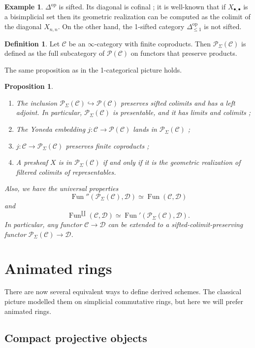 \documentclass[11pt]{article}
\newtheorem{proposition}{Proposition}
\theoremstyle{definition}
\newtheorem{definition}{Definition}
\newtheorem{example}{Example}
\newcommand{\C}{\mathcal{C}}
\newcommand{\D}{\mathcal{D}}
\newcommand{\Fun}{\operatorname{Fun}}
\newcommand{\op}{\mathrm{op}}
\renewcommand{\P}{\mathcal{P}}
\begin{document}
\begin{example}
    $\Delta^{\op}$ is sifted.
    Its diagonal is cofinal ; it is well-known that if $X_{\bullet, \bullet}$ is a bisimplicial set then its geometric realization can be computed as the colimit of the diagonal $X_{n, n}$.
    On the other hand, the 1-sifted category $\Delta^{\op}_{\leqslant 1}$ is not sifted.
\end{example}

\begin{definition}
    Let $\C$ be an $\infty$-category with finite coproducts.
    Then $\P_{\Sigma}(\C)$ is defined as the full subcategory of $\P(\C)$ on functors that preserve products.
\end{definition}

The same proposition as in the 1-categorical picture holds.
\begin{proposition}
    \begin{enumerate}
        \item The inclusion $\P_{\Sigma}(\C) \hookrightarrow \P(\C)$ preserves sifted colimits and has a left adjoint.
        In particular, $\P_{\Sigma}(\C)$ is presentable, and it has limits and colimits ;
        \item The Yoneda embedding $j : \C \to \P(\C)$ lands in $\P_{\Sigma}(\C)$ ;
        \item $j : \C \to \P_{\Sigma}(\C)$ preserves finite coproducts ;
        \item A presheaf $X$ is in $\P_{\Sigma}(\C)$ if and only if it is the geometric realization of filtered colimits of representables.
    \end{enumerate}
    Also, we have the universal properties
    \[
        \Fun''(\P_{\Sigma}(\C), \D) \simeq \Fun(\C, \D)
    \]
    and
    \[
        \Fun^{\amalg}(\C, \D) \simeq \Fun'(\P_{\Sigma}(\C), \D).
    \]
    In particular, any functor $\C \to \D$ can be extended to a sifted-colimit-preserving functor $\P_{\Sigma}(\C) \to \D$.
\end{proposition}

\section{Animated rings}

There are now several equivalent ways to define derived schemes.
The classical picture modelled them on simplicial commutative rings, but here we will prefer animated rings.

\subsection{Compact projective objects}
\end{document}
